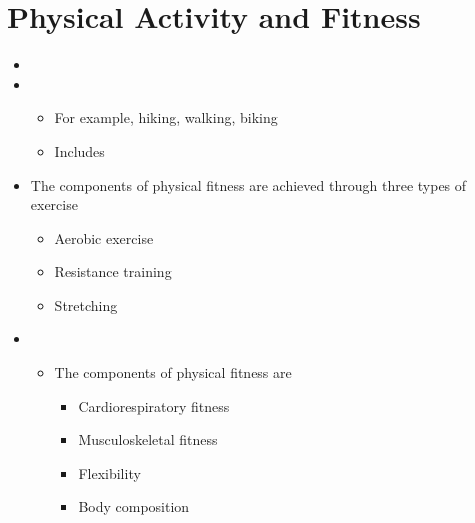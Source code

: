 \documentclass[title={Chapter 11}]{fdsn201notes}
\begin{document}
%
%
%

\section{Physical Activity and Fitness}\label{sec:physical-activity-and-fitness}
\begin{itemize}
	\item {}
	\item {}
	\begin{itemize}
		\item For example, hiking, walking, biking
		\item Includes 
	\end{itemize}
	\item The components of physical fitness are achieved through three types of exercise
	\begin{itemize}
		\item Aerobic exercise
		\item Resistance training
		\item Stretching
	\end{itemize}
	\item {}
	\begin{itemize}
		\item The components of physical fitness are
		\begin{itemize}
			\item Cardiorespiratory fitness
			\item Musculoskeletal fitness
			\item Flexibility
			\item Body composition
		\end{itemize}
	\end{itemize}
\end{itemize}
\end{document}
